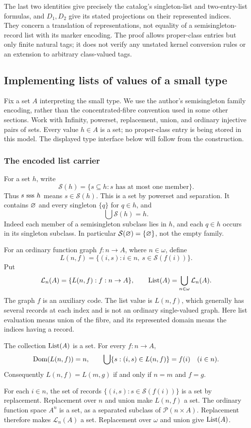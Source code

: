 The last two identities give precisely the catalog's singleton-list and
two-entry-list formulas, and $D_1,D_2$ give its stated projections on
their represented indices. They concern a translation of representations,
not equality of a semisingleton-record list with its marker encoding.
The proof allows proper-class entries but only finite natural tags;
it does not verify any unstated kernel conversion rules or an extension
to arbitrary class-valued tags.

\subsection{Implementing lists of values of a small type}
Fix a set $A$ interpreting the small type. We use the author's
semisingleton family encoding, rather than the concentrated-fibre
convention used in some other sections. Work with Infinity, powerset,
replacement, union, and ordinary injective pairs of sets. Every value
$h\in A$ is a set; no proper-class entry is being stored in this model.
The displayed type interface below will follow from the construction.

\subsubsection{The encoded list carrier}
For a set $h$, write
\[
\mathcal S(h)=\{s\subseteq h:s\text{ has at most one member}\}.
\]
Thus $s\mathrm{\ sss\ } h$ means $s\in\mathcal S(h)$. This is a set by
powerset and separation. It contains $\varnothing$ and every singleton
$\{q\}$ for $q\in h$, and
\[
\bigcup\mathcal S(h)=h.
\]
Indeed each member of a semisingleton subclass lies in $h$, and each
$q\in h$ occurs in its singleton subclass. In particular
$\mathcal S(\varnothing)=\{\varnothing\}$, not the empty family.

For an ordinary function graph $f:n\to A$, where $n\in\omega$, define
\[
L(n,f)=\{(i,s):i\in n,\ s\in\mathcal S(f(i))\}.
\]
Put
\[
\mathcal L_n(A)=\{L(n,f):f:n\to A\},\qquad
\mathrm{List}(A)=\bigcup_{n\in\omega}\mathcal L_n(A).
\]
The graph $f$ is an auxiliary code. The list value is $L(n,f)$,
which generally has several records at each index and is not an
ordinary single-valued graph. Here list evaluation means union of the
fibre, and its represented domain means the indices having a record.

\begin{lemma}
The collection $\mathrm{List}(A)$ is a set. For every $f:n\to A$,
\[
\mathrm{Dom}(L(n,f))=n,\qquad
\bigcup\{s:(i,s)\in L(n,f)\}=f(i)\quad(i\in n).
\]
Consequently $L(n,f)=L(m,g)$ if and only if $n=m$ and $f=g$.
\end{lemma}
\Proof
For each $i\in n$, the set of records
$\{(i,s):s\in\mathcal S(f(i))\}$ is a set by replacement.
Replacement over $n$ and union make $L(n,f)$ a set. The ordinary
function space $A^n$ is a set, as a separated subclass of
$\mathcal P(n\times A)$. Replacement therefore makes $\mathcal L_n(A)$
a set. Replacement over $\omega$ and union give $\mathrm{List}(A)$.

